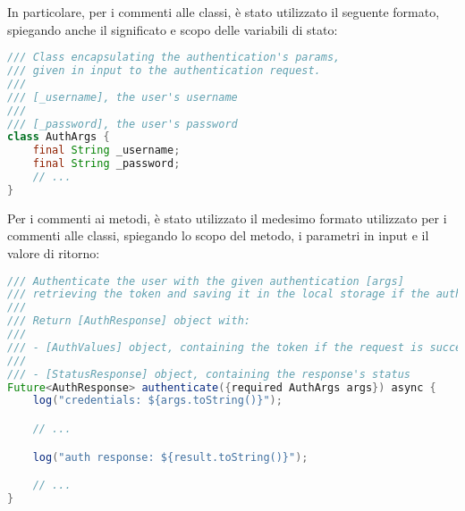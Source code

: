 \noindent In particolare, per i commenti alle classi, è stato utilizzato il seguente formato, spiegando anche il significato e scopo delle variabili di stato:
\begin{lstlisting}[language=Java, caption={Commento classe}, captionpos=b]
/// Class encapsulating the authentication's params,
/// given in input to the authentication request.
///
/// [_username], the user's username
///
/// [_password], the user's password
class AuthArgs {
    final String _username;
    final String _password;
    // ...
}
\end{lstlisting}

\noindent Per i commenti ai metodi, è stato utilizzato il medesimo formato utilizzato per i commenti alle classi, spiegando lo scopo del metodo, i parametri in input e il valore di ritorno:
\begin{lstlisting}[language=Java, caption={Commento metodo}, captionpos=b]
/// Authenticate the user with the given authentication [args]
/// retrieving the token and saving it in the local storage if the authentication request is successful.
///
/// Return [AuthResponse] object with:
///
/// - [AuthValues] object, containing the token if the request is successful
///
/// - [StatusResponse] object, containing the response's status
Future<AuthResponse> authenticate({required AuthArgs args}) async {
    log("credentials: ${args.toString()}");

    // ...

    log("auth response: ${result.toString()}");

    // ...
}
\end{lstlisting}
